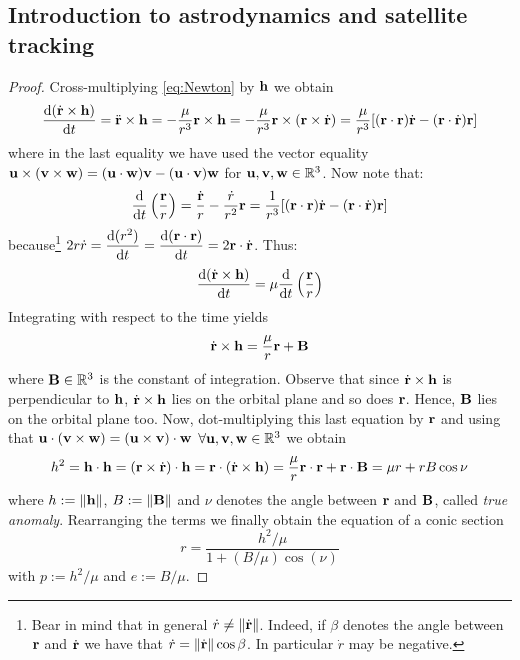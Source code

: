 \documentclass[../main.tex]{subfiles}
\begin{document}
\subsection{Introduction to astrodynamics and satellite tracking}\label{sec:app2}
\keplerA*
\begin{proof}
  Cross-multiplying \cref{eq:Newton} by $\vf{h}$ we obtain
  \begin{equation}
    \dv{(\dot{\vf{r}}\times\vf{h})}{t}=\ddot{\vf{r}}\times\vf{h}=-\frac{\mu}{r^3}\vf{r}\times\vf{h}=-\frac{\mu}{r^3}\vf{r}\times(\vf{r}\times \dot{\vf{r}})=\frac{\mu}{r^3}[(\vf{r}\cdot{\vf{r}})\dot{\vf{r}}-(\vf{r}\cdot\dot{\vf{r}})\vf{r}]
  \end{equation}
  where in the last equality we have used the vector equality $\vf{u}\times(\vf{v}\times\vf{w})=(\vf{u}\cdot\vf{w})\vf{v}-(\vf{u}\cdot\vf{v})\vf{w}$ for $\vf{u}, \vf{v}, \vf{w}\in\RR^3$. Now note that:
  \begin{equation}
    \dv{}{t}\left(\frac{\vf{r}}{r}\right)=\frac{\dot{\vf{r}}}{r}-\frac{\dot{r}}{r^2}\vf{r}= \frac{1}{r^3}[(\vf{r}\cdot{\vf{r}})\dot{\vf{r}}-(\vf{r}\cdot\dot{\vf{r}})\vf{r}]
  \end{equation}
  because\footnote{Bear in mind that in general $\dot{r}\ne\norm{\dot{\vf{r}}}$. Indeed, if $\beta$ denotes the angle between $\vf{r}$ and $\dot{\vf{r}}$ we have that $\dot{r}=\norm{\dot{\vf{r}}}\cos\beta$. In particular $\dot{r}$ may be negative.} $\displaystyle 2r\dot{r}=\dv{(r^2)}{t}=\dv{(\vf{r}\cdot\vf{r})}{t}=2\vf{r}\cdot\dot{\vf{r}}$. Thus:
  \begin{equation}
    \dv{(\dot{\vf{r}}\times\vf{h})}{t}=\mu \dv{}{t}\left(\frac{\vf{r}}{r}\right)
  \end{equation}
  Integrating with respect to the time yields
  \begin{equation}
    \dot{\vf{r}}\times \vf{h}=\frac{\mu}{r}\vf{r}+\vf{B}
  \end{equation}
  where $\vf{B}\in\RR^3$ is the constant of integration. Observe that since $\dot{\vf{r}}\times\vf{h}$ is perpendicular to $\vf{h}$, $\dot{\vf{r}}\times\vf{h}$ lies on the orbital plane and so does $\vf{r}$. Hence, $\vf{B}$ lies on the orbital plane too. Now, dot-multiplying this last equation by $\vf{r}$ and using that $\vf{u}\cdot(\vf{v}\times\vf{w})=(\vf{u}\times\vf{v})\cdot\vf{w}$ $\forall\vf{u},\vf{v},\vf{w}\in\RR^3$ we obtain
  \begin{equation}
    h^2=\vf{h}\cdot\vf{h}=(\vf{r}\times\dot{\vf{r}})\cdot\vf{h}=\vf{r}\cdot(\dot{\vf{r}}\times\vf{h})=\frac{\mu}{r}\vf{r}\cdot\vf{r}+\vf{r}\cdot\vf{B}=\mu r+rB\cos\nu
  \end{equation}
  where $h:=\norm{\vf{h}}$, $B:=\norm{\vf{B}}$ and $\nu$ denotes the angle between $\vf{r}$ and $\vf{B}$, called \emph{true anomaly}. Rearranging the terms we finally obtain the equation of a conic section
  \begin{equation}
    r=\frac{h^2/\mu}{1+(B/\mu)\cos(\nu)}
  \end{equation}
  with $p:=h^2/\mu$ and $e:=B/\mu$.
\end{proof}
\end{document}
